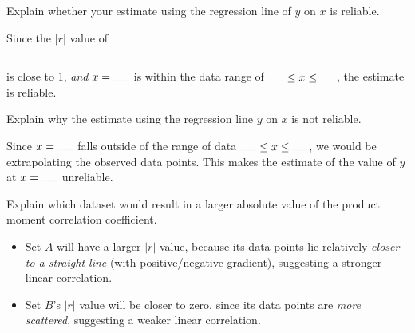 \documentclass[../Notes.tex]{subfiles}
\begin{document}
\begin{note}
  Explain whether your estimate using the regression line of \(y\) on \(x\) is reliable.
  \begin{center}
    \parbox{0.9\textwidth}{
      Since the \(\lvert r \rvert\) value of \rule{0.5cm}{0.01mm} is close to 1, \emph{and} \(x=\rule{0.5cm}{0.01mm}\) is within the data range of \(\rule{0.5cm}{0.01mm}\leq x\leq \rule{0.5cm}{0.01mm}\), the estimate is reliable.
    }
  \end{center}
\end{note}
\begin{note}
  Explain why the estimate using the regression line \(y\) on \(x\) is not reliable.
  \begin{center}
    \parbox{0.9\textwidth}{
      Since \(x=\rule{0.5cm}{0.01mm}\) falls outside of the range of data \(\rule{0.5cm}{0.01mm}\leq x\leq \rule{0.5cm}{0.01mm}\), we would be extrapolating the observed data points. This makes the estimate of the value of \(y\) at \(x=\rule{0.5cm}{0.01mm}\) unreliable.
    }
  \end{center}
\end{note}
\begin{note}
  Explain which dataset would result in a larger absolute value of the product moment correlation coefficient.
  \begin{itemize}
    \item Set \(A\) will have a larger \(\lvert r \rvert\) value, because its data points lie relatively \emph{closer to a straight line} (with positive/negative gradient), suggesting a stronger linear correlation.
    \item Set \(B\)'s \(\lvert r \rvert\) value will be closer to zero, since its data points are \emph{more scattered}, suggesting a weaker linear correlation. 
  \end{itemize}
\end{note}
\end{document}
